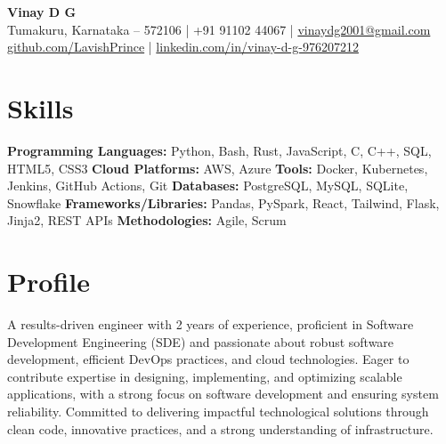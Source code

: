 \documentclass[a4paper,10pt]{article}
\begin{document}
\textbf{\Large Vinay D G} \\Tumakuru, Karnataka – 572106 \quad | \quad +91 91102 44067 \quad | \quad \href{mailto:vinaydg2001@gmail.com}{vinaydg2001@gmail.com} \\\href{https://github.com/LavishPrince}{github.com/LavishPrince} \quad | \quad \href{https://www.linkedin.com/in/vinay-d-g-976207212/}{linkedin.com/in/vinay-d-g-976207212}

\section*{Skills}
\textbf{Programming Languages:} Python, Bash, Rust, JavaScript, C, C++, SQL, HTML5, CSS3
\textbf{Cloud Platforms:} AWS, Azure
\textbf{Tools:} Docker, Kubernetes, Jenkins, GitHub Actions, Git
\textbf{Databases:} PostgreSQL, MySQL, SQLite, Snowflake
\textbf{Frameworks/Libraries:} Pandas, PySpark, React, Tailwind, Flask, Jinja2, REST APIs
\textbf{Methodologies:} Agile, Scrum

\section*{Profile}
A results-driven engineer with 2 years of experience, proficient in Software Development Engineering (SDE) and passionate about robust software development, efficient DevOps practices, and cloud technologies. Eager to contribute expertise in designing, implementing, and optimizing scalable applications, with a strong focus on software development and ensuring system reliability. Committed to delivering impactful technological solutions through clean code, innovative practices, and a strong understanding of infrastructure.

\end{document}
